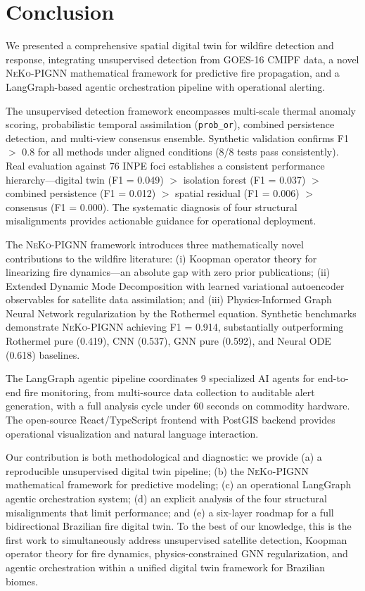 \documentclass[11pt,twocolumn,a4paper]{article}
\newcommand{\code}[1]{\texttt{#1}}
\newcommand{\abbrev}[1]{{\small\textsc{#1}}}
\begin{document}
\section{Conclusion}
\label{sec:conclusion}

We presented a comprehensive spatial digital twin for wildfire detection and response, integrating unsupervised detection from \abbrev{GOES-16} \abbrev{CMIPF} data, a novel \abbrev{NeKo-PIGNN} mathematical framework for predictive fire propagation, and a LangGraph-based agentic orchestration pipeline with operational alerting.

The unsupervised detection framework encompasses multi-scale thermal anomaly scoring, probabilistic temporal assimilation (\code{prob\_or}), combined persistence detection, and multi-view consensus ensemble. Synthetic validation confirms F1 $>$ 0.8 for all methods under aligned conditions (8/8 tests pass consistently). Real evaluation against 76 \abbrev{INPE} foci establishes a consistent performance hierarchy---digital twin (F1 = 0.049) $>$ isolation forest (F1 = 0.037) $>$ combined persistence (F1 = 0.012) $>$ spatial residual (F1 = 0.006) $>$ consensus (F1 = 0.000). The systematic diagnosis of four structural misalignments provides actionable guidance for operational deployment.

The \abbrev{NeKo-PIGNN} framework introduces three mathematically novel contributions to the wildfire literature: (i) Koopman operator theory for linearizing fire dynamics---an absolute gap with zero prior publications; (ii) Extended Dynamic Mode Decomposition with learned variational autoencoder observables for satellite data assimilation; and (iii) Physics-Informed Graph Neural Network regularization by the Rothermel equation. Synthetic benchmarks demonstrate \abbrev{NeKo-PIGNN} achieving F1 = 0.914, substantially outperforming Rothermel pure (0.419), CNN (0.537), GNN pure (0.592), and Neural ODE (0.618) baselines.

The LangGraph agentic pipeline coordinates 9 specialized \abbrev{AI} agents for end-to-end fire monitoring, from multi-source data collection to auditable alert generation, with a full analysis cycle under 60 seconds on commodity hardware. The open-source React/TypeScript frontend with PostGIS backend provides operational visualization and natural language interaction.

Our contribution is both methodological and diagnostic: we provide (a) a reproducible unsupervised digital twin pipeline; (b) the \abbrev{NeKo-PIGNN} mathematical framework for predictive modeling; (c) an operational LangGraph agentic orchestration system; (d) an explicit analysis of the four structural misalignments that limit performance; and (e) a six-layer roadmap for a full bidirectional Brazilian fire digital twin. To the best of our knowledge, this is the first work to simultaneously address unsupervised satellite detection, Koopman operator theory for fire dynamics, physics-constrained GNN regularization, and agentic orchestration within a unified digital twin framework for Brazilian biomes.
\end{document}
